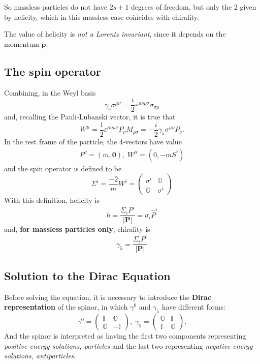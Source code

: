 
So massless particles do not have $2s+1$ degrees of freedom, but only
the $2$ given by helicity, which in this massless case coincides with chirality.

The value of helicity is \textit{not a Lorentz invariant}, since it depends
on the momentum $\mathbf{p}$.

\subsection{The spin operator}
Combining, in the Weyl basis
$$\gamma_5\sigma^{\mu\nu} = \frac{i}{2}\varepsilon^{\mu\nu\rho\sigma}
\sigma_{\sigma\rho}$$
and, recalling the Pauli-Lubanski vector, it is true that
$$W^\mu = \frac{1}{2}\varepsilon^{\mu\nu\rho\sigma}P_\nu M_{\rho\sigma}=
-\frac{i}{2}\gamma_5\sigma^{\mu\nu}P_\nu.$$
In the rest frame of the particle, the 4-vectors have value
\begin{gather*}
P^\nu = (m,\mathbf{0}),\; W^\mu = (0, -mS^i)
\end{gather*}
and the spin operator is defined to be
$$\Sigma^i = \frac{-2}{m}W^i=\begin{pmatrix}
    \sigma^i&\mathbb{O}\\
    \mathbb{O}&\sigma^i
\end{pmatrix}
$$
With this definition, helicity is
$$h = \frac{\Sigma_iP^i}{|\mathbf{P}|} = \sigma_i\hat P^i$$
and, \textbf{for massless particles only}, chirality is
$$\gamma_5 = \frac{\Sigma_iP^i}{|\mathbf{P}|}$$

\subsection{Solution to the Dirac Equation}
Before solving the equation, it is necessary to introduce the
\textbf{Dirac representation} of the spinor, in which $\gamma^0$ and
$\gamma_5$ have different forms:
$$\gamma^0 = \begin{pmatrix}
    \mathbb{I}&\mathbb{O}\\
    \mathbb{O}&-\mathbb{I}
\end{pmatrix},\; \gamma_5=\begin{pmatrix}
    \mathbb{O}&\mathbb{I}\\
    \mathbb{I}&\mathbb{O}
\end{pmatrix}.
$$
And the spinor is interpreted as having the first two components representing
\textit{positive energy solutions, particles} and the last two representing
\textit{negative energy solutions, antiparticles}.

